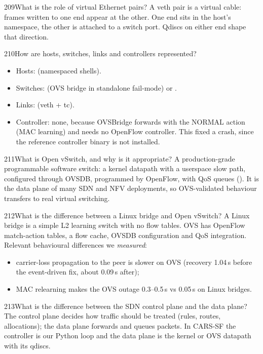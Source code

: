 \begin{qa}{209}{What is the role of virtual Ethernet pairs?}
A veth pair is a virtual cable: frames written to one end appear at the other. One end sits in the host's namespace,
the other is attached to a switch port. Qdiscs on either end shape that direction.
\end{qa}

\begin{qa}{210}{How are hosts, switches, links and controllers represented?}
\begin{itemize}
\item Hosts:  (namespaced shells).
\item Switches:  (OVS bridge in standalone fail-mode) or .
\item Links:  (veth + tc).
\item Controller: none, because OVSBridge forwards with the NORMAL action (MAC learning) and needs no OpenFlow
controller. This fixed a crash, since the reference controller binary is not installed.
\end{itemize}
\end{qa}

\begin{qa}{211}{What is Open vSwitch, and why is it appropriate?}
A production-grade programmable software switch: a kernel datapath with a userspace slow path, configured through
OVSDB, programmed by OpenFlow, with QoS queues (). It is the data plane of many SDN and NFV
deployments, so OVS-validated behaviour transfers to real virtual switching.
\end{qa}

\begin{qa}{212}{What is the difference between a Linux bridge and Open vSwitch?}
A Linux bridge is a simple L2 learning switch with no flow tables. OVS has OpenFlow match-action tables, a flow cache,
OVSDB configuration and QoS integration. Relevant behavioural differences we \emph{measured}:
\begin{itemize}
\item carrier-loss propagation to the peer is slower on OVS (recovery 1.04\,s before the event-driven fix, about
0.09\,s after);
\item MAC relearning makes the OVS outage 0.3--0.5\,s vs 0.05\,s on Linux bridges.
\end{itemize}
\end{qa}

\begin{qa}{213}{What is the difference between the SDN control plane and the data plane?}
The control plane decides how traffic should be treated (rules, routes, allocations); the data plane forwards and
queues packets. In CARS-SF the controller is our Python loop and the data plane is the kernel or OVS datapath with
its qdiscs.
\end{qa}

